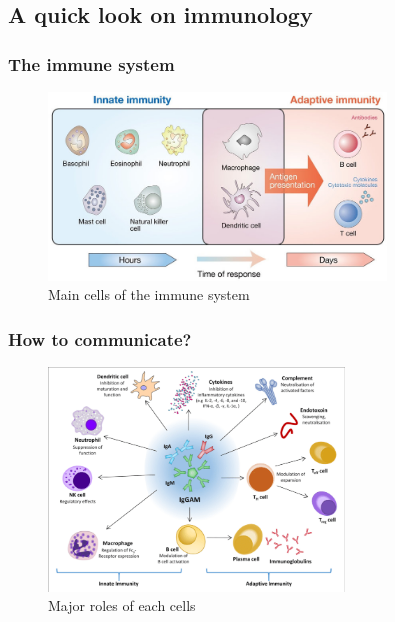 \subsection{A quick look on immunology}


\begin{frame}
    \frametitle{The immune system}
\begin{figure}
    \centering
    \includegraphics[width=0.8\textwidth]{imgs/ImmunityCells.png}
    \caption{Main cells of the immune system \autocite{yamauchiHippoPathwayMammalian2019}}
    \label{fig:responses3}
\end{figure}
\end{frame}

\begin{frame}
    \frametitle{How to communicate?}
\begin{figure}
    \centering
    \includegraphics[width=0.7\textwidth]{imgs/Communication.png}
    \caption{Major roles of each cells \autocite{jarczakSepsisPathophysiologyTherapeutic2021}}
    \label{fig:responses10}
\end{figure}
\end{frame}

